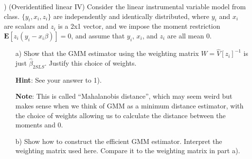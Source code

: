 \documentclass[12pt,english]{article}
\begin{document}
\vspace{1em}
) (Overidentified linear IV) Consider the linear instrumental variable model from class. $\{ y_{i}, x_{i}, z_{i} \}$ are independently and identically distributed, where $y_{i}$ and $x_{i}$ are scalars and $z_{i}$ is a 2x1 vector, and we impose the moment restriction $\mathbf{E}[z_{i}(y_{i} - x_{i} \beta)] = 0$, and assume that $y_{i}$, $x_{i}$, and $z_{i}$ are all mean 0.

\begin{enumerate}
	\item[a)] Show that the GMM estimator using the weighting matrix $W = \hat{V}[z_{i}]^{-1}$ is just $\hat{\beta}_{2SLS}$. Justify this choice of weights.
	
	\textbf{Hint}: See your answer to 1).
	
	\textbf{Note}: This is called ``Mahalanobis distance'', which may seem weird but makes sense when we think of GMM as a minimum distance estimator, with the choice of weights allowing us to calculate the distance between the moments and 0.
	
	\item[b)] Show how to construct the efficient GMM estimator. Interpret the weighting matrix used here. Compare it to the weighting matrix in part a).
\end{enumerate}
\end{document}
